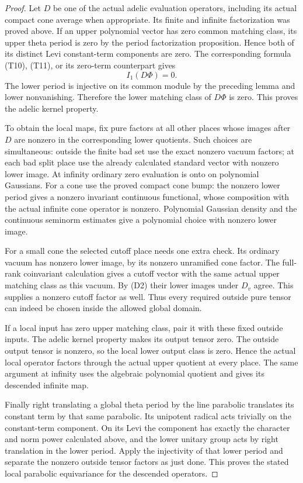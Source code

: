 \begin{proof}
Let \(D\) be one of the actual adelic evaluation operators, including
its actual compact cone average when appropriate.
Its finite and infinite factorization was proved above.
If an upper polynomial vector has zero common matching class,
its upper theta period is zero by the period factorization
proposition. Hence both of its distinct Levi constant-term
components are zero. The corresponding formula (T10), (T11),
or its zero-term counterpart gives
\[
                      I_1(D\Phi)=0.
\]
The lower period is injective on its common module by the preceding
lemma and lower nonvanishing. Therefore the lower matching class
of \(D\Phi\) is zero. This proves the adelic kernel property.

To obtain the local maps, fix pure factors at all other places
whose images after \(D\) are nonzero in the corresponding lower
quotients. Such choices are simultaneous: outside the finite bad
set use the exact nonzero vacuum factors; at each bad split place
use the already calculated standard vector with nonzero lower
image. At infinity ordinary zero evaluation is onto on polynomial
Gaussians. For a cone use the proved compact cone bump: the
nonzero lower period gives a nonzero invariant continuous
functional, whose composition with the actual infinite cone
operator is nonzero. Polynomial Gaussian density and the
continuous seminorm estimates give a polynomial choice with
nonzero lower image.

For a small cone the selected cutoff place needs one extra check.
Its ordinary vacuum has nonzero lower image, by its nonzero
unramified cone factor. The full-rank coinvariant calculation
gives a cutoff vector with the same actual upper matching class
as this vacuum. By (D2) their lower images under \(D_v\) agree.
This supplies a nonzero cutoff factor as well. Thus every
required outside pure tensor can indeed be chosen inside the
allowed global domain.

If a local input has zero upper matching class, pair it with
these fixed outside inputs. The adelic kernel property makes
its output tensor zero. The outside output tensor is nonzero,
so the local lower output class is zero. Hence the actual local
operator factors through the actual upper quotient at every
place. The same argument at infinity uses the algebraic
polynomial quotient and gives its descended infinite map.

Finally right translating a global theta period by the line
parabolic translates its constant term by that same parabolic.
Its unipotent radical acts trivially on the constant-term
component. On its Levi the component has exactly the character
and norm power calculated above, and the lower unitary group
acts by right translation in the lower period. Apply the
injectivity of that lower period and separate the nonzero
outside tensor factors as just done. This proves the stated
local parabolic equivariance for the descended operators.
\end{proof}

